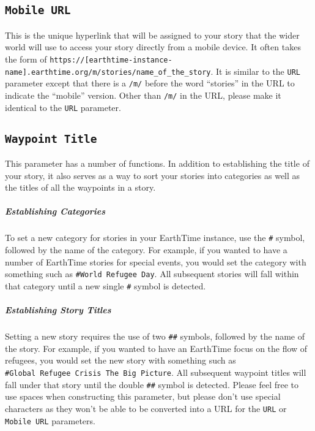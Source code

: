 \documentclass[
]{krantz}
\begin{document}
\hypertarget{mobile-url}{%
\subsection*{\texorpdfstring{\texttt{Mobile\ URL}}{Mobile URL}}\label{mobile-url}}


This is the unique hyperlink that will be assigned to your story that the wider world will use to access your story directly from a mobile device. It often takes the form of \texttt{https://{[}earthtime-instance-name{]}.earthtime.org/m/stories/name\_of\_the\_story}. It is similar to the \texttt{URL} parameter except that there is a \texttt{/m/} before the word ``stories'' in the URL to indicate the ``mobile'' version. Other than \texttt{/m/} in the URL, please make it identical to the \texttt{URL} parameter.

\hypertarget{waypoint-title}{%
\subsection*{\texorpdfstring{\texttt{Waypoint\ Title}}{Waypoint Title}}\label{waypoint-title}}


This parameter has a number of functions. In addition to establishing the title of your story, it also serves as a way to sort your stories into categories as well as the titles of all the waypoints in a story.

\hypertarget{establishing-categories}{%
\subparagraph*{Establishing Categories}\label{establishing-categories}}

To set a new category for stories in your EarthTime instance, use the \texttt{\#} symbol, followed by the name of the category. For example, if you wanted to have a number of EarthTime stories for special events, you would set the category with something such as \texttt{\#World\ Refugee\ Day}. All subsequent stories will fall within that category until a new single \texttt{\#} symbol is detected.

\hypertarget{establishing-story-titles}{%
\subparagraph*{Establishing Story Titles}\label{establishing-story-titles}}

Setting a new story requires the use of two \texttt{\#\#} symbols, followed by the name of the story. For example, if you wanted to have an EarthTime focus on the flow of refugees, you would set the new story with something such as \texttt{\#Global\ Refugee\ Crisis\ The\ Big\ Picture}. All subsequent waypoint titles will fall under that story until the double \texttt{\#\#} symbol is detected. Please feel free to use spaces when constructing this parameter, but please don't use special characters as they won't be able to be converted into a URL for the \texttt{URL} or \texttt{Mobile\ URL} parameters.
\end{document}
